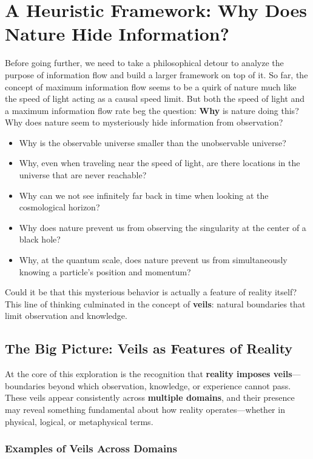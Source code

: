 \documentclass[12pt]{article}
\begin{document}
\section{A Heuristic Framework: Why Does Nature Hide Information?}

Before going further, we need to take a philosophical detour to analyze the purpose of information flow and build a larger framework on top of it. So far, the concept of maximum information flow seems to be a quirk of nature much like the speed of light acting as a causal speed limit. But both the speed of light and a maximum information flow rate beg the question: \textbf{Why} is nature doing this? Why does nature seem to mysteriously hide information from observation?
\begin{itemize}
    \item Why is the observable universe smaller than the unobservable universe?
    \item Why, even when traveling near the speed of light, are there locations in the universe that are never reachable?
    \item Why can we not see infinitely far back in time when looking at the cosmological horizon?
    \item Why does nature prevent us from observing the singularity at the center of a black hole?
    \item Why, at the quantum scale, does nature prevent us from simultaneously knowing a particle's position and momentum?
\end{itemize}

Could it be that this mysterious behavior is actually a feature of reality itself? This line of thinking culminated in the concept of \textbf{veils}: natural boundaries that limit observation and knowledge.

\subsection{The Big Picture: Veils as Features of Reality}

At the core of this exploration is the recognition that \textbf{reality imposes veils}—boundaries beyond which observation, knowledge, or experience cannot pass. These veils appear consistently across \textbf{multiple domains}, and their presence may reveal something fundamental about how reality operates—whether in physical, logical, or metaphysical terms.

\subsubsection{Examples of Veils Across Domains}
\end{document}
